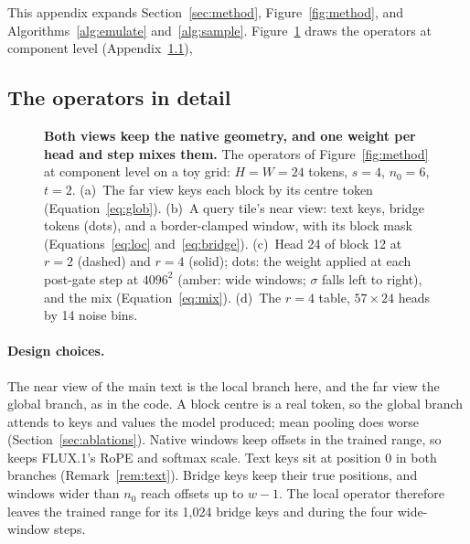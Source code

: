 \apxbarrier
\section{}
\label{app:impl}

This appendix expands Section~\ref{sec:method}, Figure~\ref{fig:method}, and Algorithms~\ref{alg:emulate} and~\ref{alg:sample}. Figure~\ref{fig:method_zoom} draws the operators at component level (Appendix~\ref{app:zoom}), 

\subsection{The operators in detail}
\label{app:zoom}

\begin{figure}[!htbp]
  \centering
  \caption{\textbf{Both views keep the native geometry, and one weight per head and step mixes them.} The operators of Figure~\ref{fig:method} at component level on a toy grid: $H=W=24$ tokens, $s=4$, $n_0=6$, $t=2$. (a)~The far view keys each block by its centre token (Equation~\ref{eq:glob}). (b)~A query tile's near view: text keys, bridge tokens (dots), and a border-clamped window, with its block mask (Equations~\ref{eq:loc} and~\ref{eq:bridge}). (c)~Head 24 of block 12 at $r=2$ (dashed) and $r=4$ (solid); dots: the weight applied at each post-gate step at $4096^2$ (amber: wide windows; $\sigma$ falls left to right), and the mix (Equation~\ref{eq:mix}). (d)~The $r=4$ table, $57\times24$ heads by 14 noise bins.}
  \label{fig:method_zoom}
\end{figure}

\ifshortversion\else
\paragraph{Design choices.} The near view of the main text is the local branch here, and the far view the global branch, as in the code. A block centre is a real token, so the global branch attends to keys and values the model produced; mean pooling does worse (Section~\ref{sec:ablations}). Native windows keep offsets in the trained range, so \sca{} keeps FLUX.1's RoPE and softmax scale. Text keys sit at position 0 in both branches (Remark~\ref{rem:text}). Bridge keys keep their true positions, and windows wider than $n_0$ reach offsets up to $w-1$. The local operator therefore leaves the trained range for its 1,024 bridge keys and during the four wide-window steps.
\fi

